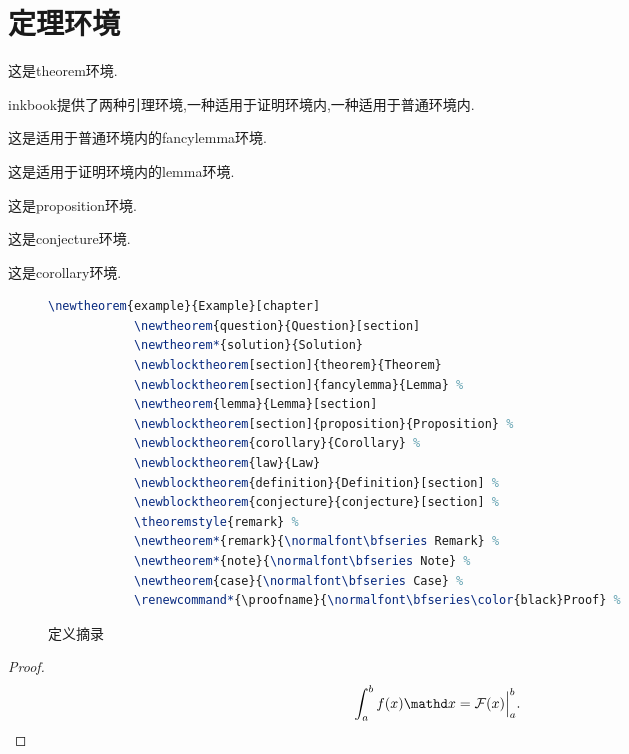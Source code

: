 \documentclass[en]{inkbook}
\begin{document}
    \section{定理环境}
    \begin{theorem}
        这是\textsf{theorem}环境.
    \end{theorem}
    \textsf{inkbook}提供了两种引理环境,一种适用于证明环境内,一种适用于普通环境内.
    \begin{fancylemma}
        这是适用于普通环境内的\textsf{fancylemma}环境.
    \end{fancylemma}
    \begin{lemma}
        这是适用于证明环境内的\textsf{lemma}环境.
    \end{lemma}
    \begin{proposition}
        这是\textsf{proposition}环境.
    \end{proposition}
    \begin{conjecture}
        这是\textsf{conjecture}环境.
    \end{conjecture}
    \begin{corollary}
        这是\textsf{corollary}环境.
    \end{corollary}
    \begin{figure}
        \begin{lstlisting}[language=TeX]
            \newtheorem{example}{Example}[chapter]
            \newtheorem{question}{Question}[section]
            \newtheorem*{solution}{Solution}
            \newblocktheorem[section]{theorem}{Theorem}
            \newblocktheorem[section]{fancylemma}{Lemma} %
            \newtheorem{lemma}{Lemma}[section]
            \newblocktheorem[section]{proposition}{Proposition} %
            \newblocktheorem{corollary}{Corollary} %
            \newblocktheorem{law}{Law}
            \newblocktheorem{definition}{Definition}[section] %
            \newblocktheorem{conjecture}{conjecture}[section] %
            \theoremstyle{remark} %
            \newtheorem*{remark}{\normalfont\bfseries Remark} %
            \newtheorem*{note}{\normalfont\bfseries Note} %
            \newtheorem{case}{\normalfont\bfseries Case} %
            \renewcommand*{\proofname}{\normalfont\bfseries\color{black}Proof} %
        \end{lstlisting}
        \caption{定义摘录}
    \end{figure}

    \begin{proof}
        \begin{equation}
        \int_a^b f(x)\mathd x =\mathcal{F}(x)\Big|_a^b. 
    \end{equation}
    \end{proof}
\end{document}
